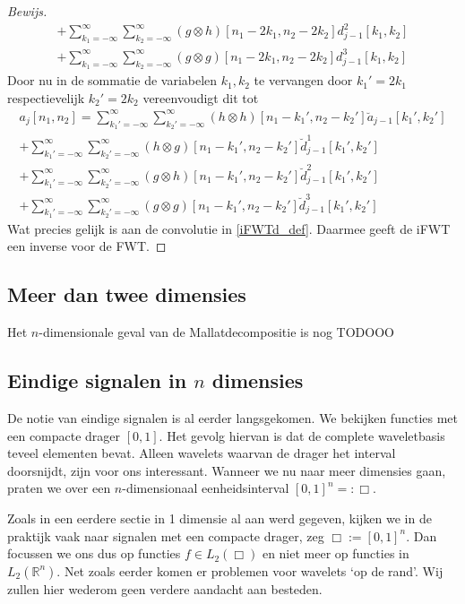 \documentclass[11pt]{uvamath}
\newcommand{\R}{\mathbb{R}}
\theoremstyle{plain}
\theoremstyle{definition}
\theoremstyle{remark}
\begin{document}
\begin{proof}[Bewijs]
\begin{equation*}
\begin{split}
      + \sum_{k_1=-\infty}^\infty\sum_{k_2=-\infty}^\infty 
      (g\otimes h)[n_1-2k_1,n_2-2k_2] d^2_{j-1}[k_1,k_2] \\
      + \sum_{k_1=-\infty}^\infty\sum_{k_2=-\infty}^\infty 
      (g\otimes g)[n_1-2k_1,n_2-2k_2] d^3_{j-1}[k_1,k_2]
      \end{split}
  \end{equation*}
  Door nu in de sommatie de variabelen $k_1,k_2$ te vervangen door $k_1'=2k_1$ respectievelijk $k_2'=2k_2$ 
  vereenvoudigt dit tot
  \begin{equation*}
    \begin{split}
      a_{j}[n_1,n_2] = 
      \sum_{k_1'=-\infty}^\infty\sum_{k_2'=-\infty}^\infty 
      (h\otimes h)[n_1-k_1',n_2-k_2'] \breve a_{j-1}[k_1',k_2'] \\
      + \sum_{k_1'=-\infty}^\infty\sum_{k_2'=-\infty}^\infty 
      (h\otimes g)[n_1-k_1',n_2-k_2'] \breve d^1_{j-1}[k_1',k_2'] \\
      + \sum_{k_1'=-\infty}^\infty\sum_{k_2'=-\infty}^\infty 
      (g\otimes h)[n_1-k_1',n_2-k_2'] \breve d^2_{j-1}[k_1',k_2'] \\
      + \sum_{k_1'=-\infty}^\infty\sum_{k_2'=-\infty}^\infty 
      (g\otimes g)[n_1-k_1',n_2-k_2'] \breve d^3_{j-1}[k_1',k_2']
      \end{split}
  \end{equation*}
  Wat precies gelijk is aan de convolutie in \ref{iFWTd_def}. Daarmee geeft de iFWT een inverse voor de FWT.
\end{proof}

\subsection{Meer dan twee dimensies}
Het $n$-dimensionale geval van de Mallatdecompositie is nog TODOOO

\subsection{Eindige signalen in $n$ dimensies}
De notie van eindige signalen is al eerder langsgekomen. We bekijken functies met een compacte drager $[0,1]$. Het gevolg hiervan is dat de complete waveletbasis teveel elementen bevat. Alleen wavelets waarvan de drager het interval doorsnijdt, zijn voor ons interessant. Wanneer we nu naar meer dimensies gaan, praten we over een $n$-dimensionaal eenheidsinterval $[0,1]^n =: \Box$. 

\iffalse
Zoals in een eerdere sectie in 1 dimensie al aan werd gegeven, kijken we in de praktijk vaak naar signalen met een compacte drager, zeg $\Box := [0,1]^n$. Dan focussen we ons dus op functies $f \in L_2(\Box)$ en niet meer op functies in $L_2(\R^n)$. Net zoals eerder komen er problemen voor wavelets `op de rand'. Wij zullen hier wederom geen verdere aandacht aan besteden.
\end{document}
